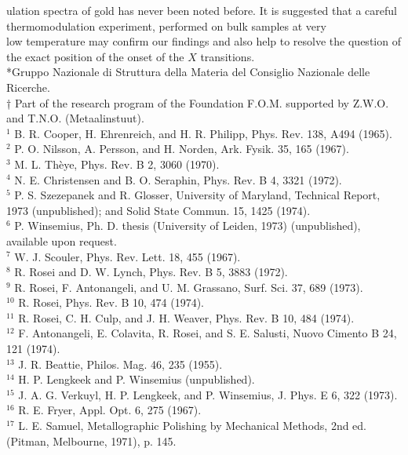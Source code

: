 \documentclass[10pt]{article}
\begin{document}
ulation spectra of gold has never been noted before. It is suggested that a careful thermomodulation experiment, performed on bulk samples at very\\
low temperature may confirm our findings and also help to resolve the question of the exact position of the onset of the $X$ transitions.\\
*Gruppo Nazionale di Struttura della Materia del Consiglio Nazionale delle Ricerche.\\
† Part of the research program of the Foundation F.O.M. supported by Z.W.O. and T.N.O. (Metaalinstuut).\\
${ }^{1}$ B. R. Cooper, H. Ehrenreich, and H. R. Philipp, Phys. Rev. 138, A494 (1965).\\
${ }^{2}$ P. O. Nilsson, A. Persson, and H. Norden, Ark. Fysik. 35, 165 (1967).\\
${ }^{3}$ M. L. Thèye, Phys. Rev. B 2, 3060 (1970).\\
${ }^{4}$ N. E. Christensen and B. O. Seraphin, Phys. Rev. B 4, 3321 (1972).\\
${ }^{5}$ P. S. Szezepanek and R. Glosser, University of Maryland, Technical Report, 1973 (unpublished); and Solid State Commun. 15, 1425 (1974).\\
${ }^{6}$ P. Winsemius, Ph. D. thesis (University of Leiden, 1973) (unpublished), available upon request.\\
${ }^{7}$ W. J. Scouler, Phys. Rev. Lett. 18, 455 (1967).\\
${ }^{8}$ R. Rosei and D. W. Lynch, Phys. Rev. B 5, 3883 (1972).\\
${ }^{9}$ R. Rosei, F. Antonangeli, and U. M. Grassano, Surf. Sci. 37, 689 (1973).\\
${ }^{10}$ R. Rosei, Phys. Rev. B 10, 474 (1974).\\
${ }^{11}$ R. Rosei, C. H. Culp, and J. H. Weaver, Phys. Rev. B 10, 484 (1974).\\
${ }^{12}$ F. Antonangeli, E. Colavita, R. Rosei, and S. E. Salusti, Nuovo Cimento B 24, 121 (1974).\\
${ }^{13}$ J. R. Beattie, Philos. Mag. 46, 235 (1955).\\
${ }^{14}$ H. P. Lengkeek and P. Winsemius (unpublished).\\
${ }^{15}$ J. A. G. Verkuyl, H. P. Lengkeek, and P. Winsemius, J. Phys. E 6, 322 (1973).\\
${ }^{16}$ R. E. Fryer, Appl. Opt. 6, 275 (1967).\\
${ }^{17}$ L. E. Samuel, Metallographic Polishing by Mechanical Methods, 2nd ed. (Pitman, Melbourne, 1971), p. 145.\\
\end{document}
